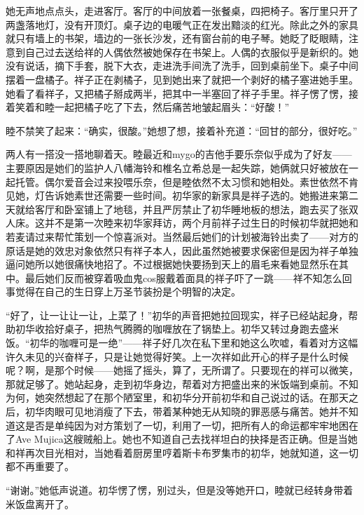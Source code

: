 \documentclass{article}
\begin{document}
她无声地点点头，走进客厅。客厅的中间放着一张餐桌，四把椅子。客厅里只开了两盏落地灯，没有开顶灯。桌子边的电暖气正在发出黯淡的红光。除此之外的家具就只有墙上的书架，墙边的一张长沙发，还有窗台前的电子琴。她眨了眨眼睛，注意到自己过去送给祥的人偶依然被她保存在书架上。人偶的衣服似乎是新织的。她没有说话，摘下手套，脱下大衣，走进洗手间洗了洗手，回到桌前坐下。桌子中间摆着一盘橘子。祥子正在剥橘子，见到她出来了就把一个剥好的橘子塞进她手里。她看了看祥子，又把橘子掰成两半，把其中一半塞回了祥子手里。祥子愣了愣，接着笑着和睦一起把橘子吃了下去，然后痛苦地皱起眉头：“好酸！”



睦不禁笑了起来：“确实，很酸。”她想了想，接着补充道：“回甘的部分，很好吃。”



两人有一搭没一搭地聊着天。睦最近和mygo的吉他手要乐奈似乎成为了好友——主要原因是她们的监护人八幡海铃和椎名立希总是一起失踪，她俩就只好被放在一起托管。偶尔爱音会过来投喂乐奈，但是睦依然不太习惯和她相处。素世依然不肯见她，灯告诉她素世还需要一些时间。初华家的新家具是祥子选的。她搬进来第二天就给客厅和卧室铺上了地毯，并且严厉禁止了初华睡地板的想法，跑去买了张双人床。这并不是第一次睦来初华家拜访，两个月前祥子过生日的时候初华就把她和若麦请过来帮忙策划一个惊喜派对。当然最后她们的计划被海铃出卖了——对方的原话是她的效忠对象依然只有祥子本人，因此虽然她被要求保密但是因为祥子单独逼问她所以她很痛快地招了。不过根据她快要扬到天上的眉毛来看她显然乐在其中。最后她们反而被穿着吸血鬼cos服戴着面具的祥子吓了一跳——祥不知怎么回事觉得在自己的生日穿上万圣节装扮是个明智的决定。



“好了，让一让让一让，上菜了！”初华的声音把她拉回现实，祥子已经站起身，帮助初华收拾好桌子，把热气腾腾的咖喱放在了锅垫上。初华又转过身跑去盛米饭。“初华的咖喱可是一绝”——祥子好几次在私下里和她这么吹嘘，看着对方这幅许久未见的兴奋样子，只是让她觉得好笑。上一次祥如此开心的样子是什么时候呢？啊，是那个时候——她摇了摇头，算了，无所谓了。只要现在的祥可以微笑，那就足够了。她站起身，走到初华身边，帮着对方把盛出来的米饭端到桌前。不知为何，她突然想起了在那个陋室里，和初华分开前初华和自己说过的话。在那天之后，初华肉眼可见地消瘦了下去，带着某种她无从知晓的罪恶感与痛苦。她并不知道这是否是单纯因为对方策划了一切，利用了一切，把所有人的命运都牢牢地困在了Ave Mujica这艘贼船上。她也不知道自己去找祥坦白的抉择是否正确。但是当她和祥再次目光相对，当她看着厨房里哼着斯卡布罗集市的初华，她就知道，这一切都不再重要了。



“谢谢。”她低声说道。初华愣了愣，别过头，但是没等她开口，睦就已经转身带着米饭盘离开了。
\end{document}
